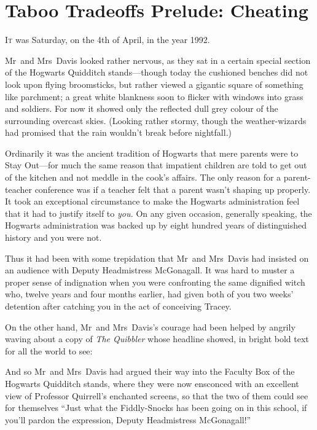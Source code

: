 \chapter{Taboo Tradeoffs Prelude: Cheating}

\lettrine{I}{t} was Saturday,
on the 4th of April, in the year 1992.

\quad\quad
Mr~and Mrs~Davis looked rather nervous, as they sat in a certain special
section of the Hogwarts Quidditch stands—though today the cushioned benches
did not look upon flying broomsticks, but rather viewed a gigantic square of
something like parchment; a great white blankness soon to flicker with windows
into grass and soldiers. For now it showed only the reflected dull grey colour
of the surrounding overcast skies. (Looking rather stormy, though the
weather-wizards had promised that the rain wouldn’t break before nightfall.)

Ordinarily it was the ancient tradition of Hogwarts that mere parents were to
Stay Out—for much the same reason that impatient children are told to get out
of the kitchen and not meddle in the cook’s affairs. The only reason for a
parent-teacher conference was if a teacher felt that a parent wasn’t shaping up
properly. It took an exceptional circumstance to make the Hogwarts
administration feel that it had to justify itself to \emph{you.} On any given
occasion, generally speaking, the Hogwarts administration was backed up by
eight hundred years of distinguished history and you were not.

Thus it had been with some trepidation that Mr~and Mrs~Davis had insisted on
an audience with Deputy Headmistress McGonagall. It was hard to muster a proper
sense of indignation when you were confronting the same dignified witch who,
twelve years and four months earlier, had given both of you two weeks’
detention after catching you in the act of conceiving Tracey.

On the other hand, Mr~and Mrs~Davis’s courage had been helped by angrily
waving about a copy of \emph{The Quibbler} whose headline showed, in bright
bold text for all the world to see:


And so Mr~and Mrs~Davis had argued their way into the Faculty Box of the
Hogwarts Quidditch stands, where they were now ensconced with an excellent view
of Professor Quirrell’s enchanted screens, so that the two of them could see
for themselves “Just what the Fiddly-Snocks has been going on in this school,
if you’ll pardon the expression, Deputy Headmistress McGonagall!”

